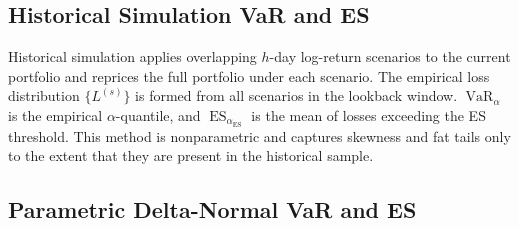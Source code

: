 \documentclass[11pt]{article}
\DeclareMathOperator{\VaR}{VaR}
\DeclareMathOperator{\ES}{ES}
\begin{document}
\subsection{Historical Simulation VaR and ES}
\label{sec:historical}

Historical simulation applies overlapping $h$-day log-return scenarios to
the current portfolio and reprices the full portfolio under each scenario.
The empirical loss distribution $\{L^{(s)}\}$ is formed from all
scenarios in the lookback window.  $\VaR_\alpha$ is the empirical
$\alpha$-quantile, and $\ES_{\alpha_{\mathrm{ES}}}$ is the mean of losses
exceeding the ES threshold.  This method is nonparametric and captures
skewness and fat tails only to the extent that they are present in the
historical sample.

\subsection{Parametric Delta-Normal VaR and ES}
\label{sec:parametric}
\end{document}
